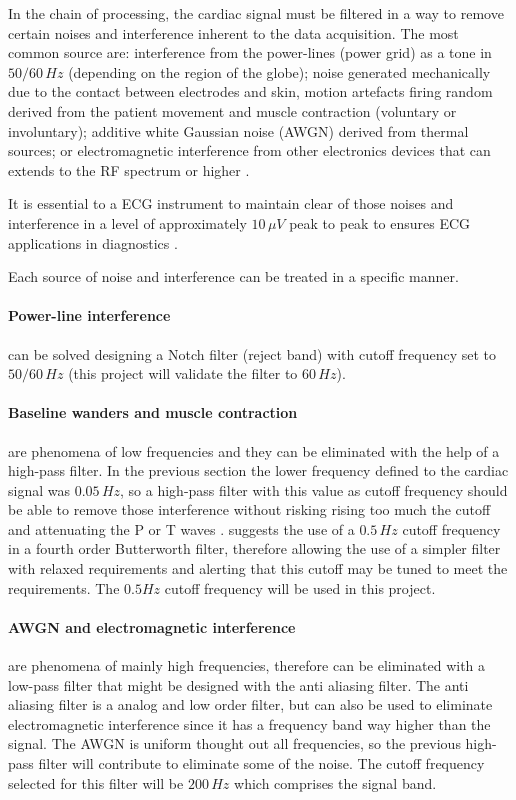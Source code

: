 In the chain of processing, the cardiac signal must be filtered in a way to remove certain noises and interference inherent to the data acquisition. The most common source are: interference from the power-lines (power grid) as a tone in $50/60 \, Hz$ (depending on the region of the globe); noise generated mechanically due to the contact between electrodes and skin, motion artefacts firing random derived from the patient movement and muscle contraction (voluntary or involuntary); additive white Gaussian noise (AWGN) derived from thermal sources; or electromagnetic interference from other electronics devices that can extends to the RF spectrum or higher \cite{khandpur1987handbook}.

It is essential to a ECG instrument to maintain clear of those noises and interference in a level of approximately $10 \, \mu V$ peak to peak to ensures ECG applications in diagnostics \cite{khandpur1987handbook}.

Each source of noise and interference can be treated in a specific manner.

\paragraph{Power-line interference} can be solved designing a Notch filter (reject band) with cutoff frequency set to $50/60 \, Hz$ (this project will validate the filter to $60 \, Hz$).

\paragraph{Baseline wanders and muscle contraction} are phenomena of low frequencies and they can be eliminated with the help of a high-pass filter. In the previous section the lower frequency defined to the cardiac signal was $0.05 \, Hz$, so a high-pass filter with this value as cutoff frequency should be able to remove those interference without risking rising too much the cutoff and attenuating the P or T waves \cite{khandpur2019compendium, khandpur1987handbook, murugappan2014development}. \textcite{sahin2020instrumentation} suggests the use of a $0.5 \, Hz$ cutoff frequency in a fourth order Butterworth filter, therefore allowing the use of a simpler filter with relaxed requirements and alerting that this cutoff may be tuned to meet the requirements. The $0.5 Hz$ cutoff frequency will be used in this project.

\paragraph{AWGN and electromagnetic interference} are phenomena of mainly high frequencies, therefore can be eliminated with a low-pass filter that might be designed with the anti aliasing filter. The anti aliasing filter is a analog and low order filter, but can also be used to eliminate electromagnetic interference since it has a frequency band way higher than the signal. The AWGN is uniform thought out all frequencies, so the previous high-pass filter will contribute to eliminate some of the noise. The cutoff frequency selected for this filter will be $200 \, Hz$ which comprises the signal band.

